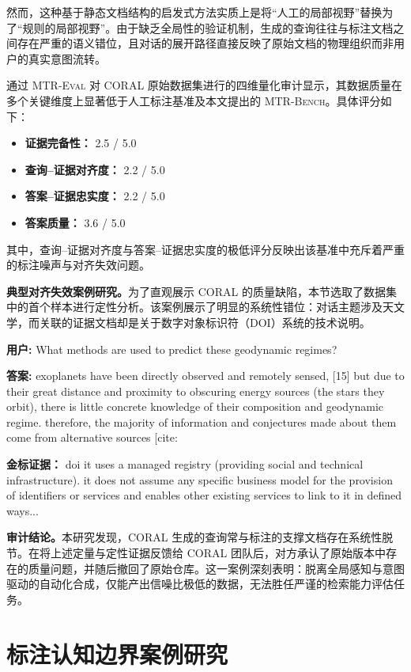 然而，这种基于静态文档结构的启发式方法实质上是将“人工的局部视野”替换为了“规则的局部视野”。由于缺乏全局性的验证机制，生成的查询往往与标注文档之间存在严重的语义错位，且对话的展开路径直接反映了原始文档的物理组织而非用户的真实意图流转。

通过 \textsc{MTR-Eval} 对 CORAL 原始数据集进行的四维量化审计显示，其数据质量在多个关键维度上显著低于人工标注基准及本文提出的 \textsc{MTR-Bench}。具体评分如下：
\begin{itemize}
    \item \textbf{证据完备性：} 2.5 / 5.0
    \item \textbf{查询--证据对齐度：} 2.2 / 5.0
    \item \textbf{答案--证据忠实度：} 2.2 / 5.0
    \item \textbf{答案质量：} 3.6 / 5.0
\end{itemize}
其中，查询--证据对齐度与答案--证据忠实度的极低评分反映出该基准中充斥着严重的标注噪声与对齐失效问题。

\textbf{典型对齐失效案例研究。}为了直观展示 CORAL 的质量缺陷，本节选取了数据集中的首个样本进行定性分析。该案例展示了明显的系统性错位：对话主题涉及天文学，而关联的证据文档却是关于数字对象标识符（DOI）系统的技术说明。

\textbf{用户:} What methods are used to predict these geodynamic regimes?  

\textbf{答案:} exoplanets have been directly observed and remotely sensed, [15] but due to their great distance and proximity to obscuring energy sources (the stars they orbit), there is little concrete knowledge of their composition and geodynamic regime. therefore, the majority of information and conjectures made about them come from alternative sources [cite: 

\textbf{金标证据：} doi it uses a managed registry (providing social and technical infrastructure). it does not assume any specific business model for the provision of identifiers or services and enables other existing services to link to it in defined ways...

\textbf{审计结论。}本研究发现，CORAL 生成的查询常与标注的支撑文档存在系统性脱节。在将上述定量与定性证据反馈给 CORAL 团队后，对方承认了原始版本中存在的质量问题，并随后撤回了原始仓库。这一案例深刻表明：脱离全局感知与意图驱动的自动化合成，仅能产出信噪比极低的数据，无法胜任严谨的检索能力评估任务。
\section{标注认知边界案例研究}
\label{app:cognitive_boundary}

